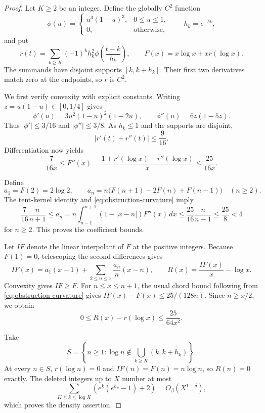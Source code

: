 \documentclass[11pt,a4paper]{article}
\theoremstyle{definition}
\theoremstyle{remark}
\numberwithin{equation}{section}
\begin{document}
\begin{proof}
Let $K\geq2$ be an integer. Define the globally $C^2$ function
\[
 \phi(u)=
 \begin{cases}u^3(1-u)^3,&0\leq u\leq1,\\0,&\text{otherwise},\end{cases}
 \qquad h_k=e^{-\delta k},
\]
and put
\[
 r(t)=\sum_{k\geq K}(-1)^k h_k^2
                  \phi\left(\frac{t-k}{h_k}\right),
 \qquad F(x)=x\log x+xr(\log x).
\]
The summands have disjoint supports $[k,k+h_k]$. Their first two
derivatives match zero at the endpoints, so $r$ is $C^2$.

We first verify convexity with explicit constants. Writing
$z=u(1-u)\in[0,1/4]$ gives
\[
 \phi'(u)=3u^2(1-u)^2(1-2u),\qquad
 \phi''(u)=6z(1-5z).
\]
Thus $|\phi'|\leq3/16$ and $|\phi''|\leq3/8$. As $h_k\leq1$ and
the supports are disjoint,
\[
 |r'(t)+r''(t)|\leq\frac9{16}.
\]
Differentiation now yields
\begin{equation}
 \frac7{16x}\leq F''(x)
   =\frac{1+r'(\log x)+r''(\log x)}x
   \leq\frac{25}{16x}.
 \label{eq:obstruction-curvature}
\end{equation}

Define
\[
 a_1=F(2)=2\log2,\qquad
 a_n=n\bigl(F(n+1)-2F(n)+F(n-1)\bigr)\quad(n\geq2).
\]
The tent-kernel identity and \eqref{eq:obstruction-curvature} imply
\[
 \frac7{16}\frac n{n+1}\leq a_n
 =n\int_{n-1}^{n+1}(1-|x-n|)F''(x)\,dx
 \leq\frac{25}{16}\frac n{n-1}\leq\frac{25}8<4
\]
for $n\geq2$. This proves the coefficient bounds.

Let $IF$ denote the linear interpolant of $F$ at the positive integers.
Because $F(1)=0$, telescoping the second differences gives
\[
 IF(x)=a_1(x-1)+\sum_{2\leq n\leq x}\frac{a_n}{n}(x-n),
 \qquad R(x)=\frac{IF(x)}x-\log x.
\]
Convexity gives $IF\geq F$. For $n\leq x\leq n+1$, the usual chord
bound following from \eqref{eq:obstruction-curvature} gives
$IF(x)-F(x)\leq25/(128n)$. Since $n\geq x/2$, we obtain
\begin{equation}
 0\leq R(x)-r(\log x)\leq\frac{25}{64x^2}.
 \label{eq:obstruction-interpolation-error}
\end{equation}

Take
\[
 S=\left\{n\geq1:\log n\notin
              \bigcup_{k\geq K}(k,k+h_k)\right\}.
\]
At every $n\in S$, $r(\log n)=0$ and $IF(n)=F(n)=n\log n$, so
$R(n)=0$ exactly. The deleted integers up to $X$ number at most
\[
 \sum_{K\leq k\leq\log X}
       \left(e^k(e^{h_k}-1)+2\right)
       =O_\beta(X^{1-\delta}),
\]
which proves the density assertion.


\end{proof}
\end{document}
